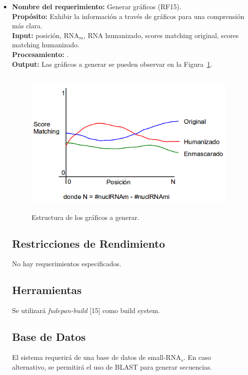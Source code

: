 \documentclass[12pt,a4paper,spanish]{article}
\begin{document}
\begin{itemize}
		\item \textbf{Nombre del requerimiento:} Generar gráficos (RF15).\\
 	    \textbf{Propósito:} Exhibir la información a través de gráficos para una comprensión más clara.\\
		\textbf{Input:} posición, RNA$_m$, RNA humanizado, scores matching original, scores matching humanizado. \\
		\textbf{Procesamiento:} .\\
		\textbf{Output:} Las gráficos a generar se pueden observar en la Figura~\ref{graphic}.
			\begin{figure}[h]
				\begin{center}
					\includegraphics[width=4.8638in,height=2.8744in]{images/graphics.png}
					\caption{Estructura de los gráficos a generar.}
					\label{graphic}
				\end{center}
			\end{figure}

\subsection{Restricciones de Rendimiento}
No hay requerimientos especificados.

\subsection{Herramientas}
	Se utilizará \textit{fudepan-build} [15] como build system.

\subsection{Base de Datos}
	\par El sistema requerirá de una base de datos de small-RNA$_s$. En caso alternativo, se permitirá el uso de BLAST para generar secuencias. 


\end{itemize}
\end{document}
